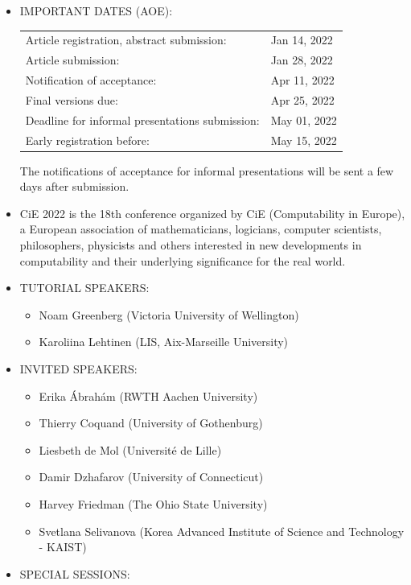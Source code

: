 \documentclass[prodmode,acmtecs]{acmsmall} %
\begin{document}
\begin{itemize}\item  IMPORTANT DATES (AOE): 
 
\begin{tabulary}{\linewidth}{LL}Article registration, abstract submission:  & Jan 14, 2022 \\
Article submission:  & Jan 28, 2022 \\
Notification of acceptance:  & Apr 11, 2022 \\
Final versions due:  & Apr 25, 2022 \\
Deadline for informal presentations submission:  & May 01, 2022 \\
Early registration before:  & May 15, 2022 \\
\end{tabulary}
 
  The notifications of acceptance for informal presentations will be sent a few days after submission. 
 
\item  CiE 2022 is the 18th conference organized by CiE (Computability in Europe), a European association of mathematicians, logicians, computer scientists, philosophers, physicists and others interested in new developments in computability and their underlying significance for the real world. 
 
\item  TUTORIAL SPEAKERS: 
 
\begin{itemize}\item  Noam Greenberg (Victoria University of Wellington)
\item  Karoliina Lehtinen (LIS, Aix-Marseille University)
\end{itemize} 
\item  INVITED SPEAKERS: 
 
\begin{itemize}\item  Erika Ábrahám (RWTH Aachen University)
\item  Thierry Coquand (University of Gothenburg)
\item  Liesbeth de Mol (Université de Lille)
\item  Damir Dzhafarov (University of Connecticut)
\item  Harvey Friedman (The Ohio State University)
\item  Svetlana Selivanova (Korea Advanced Institute of Science and Technology - KAIST)
\end{itemize} 
\item  SPECIAL SESSIONS: 
 

\end{itemize}
\end{document}
